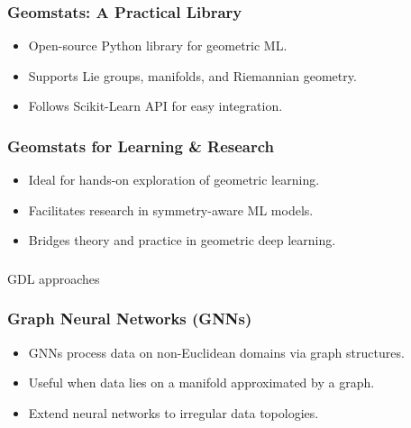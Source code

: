 \begin{frame}[fragile]\frametitle{Geomstats: A Practical Library}
  \begin{itemize}
    \item Open-source Python library for geometric ML.
    \item Supports Lie groups, manifolds, and Riemannian geometry.
    \item Follows Scikit-Learn API for easy integration.
  \end{itemize}
\end{frame}

\begin{frame}[fragile]\frametitle{Geomstats for Learning \& Research}
  \begin{itemize}
    \item Ideal for hands-on exploration of geometric learning.
    \item Facilitates research in symmetry-aware ML models.
    \item Bridges theory and practice in geometric deep learning.
  \end{itemize}
\end{frame}

\begin{frame}[fragile]\frametitle{}
\begin{center}
{\Large GDL approaches}
\end{center}
\end{frame}

\begin{frame}[fragile]\frametitle{Graph Neural Networks (GNNs)}
  \begin{itemize}
    \item GNNs process data on non-Euclidean domains via graph structures.
    \item Useful when data lies on a manifold approximated by a graph.
    \item Extend neural networks to irregular data topologies.
  \end{itemize}
\end{frame}

